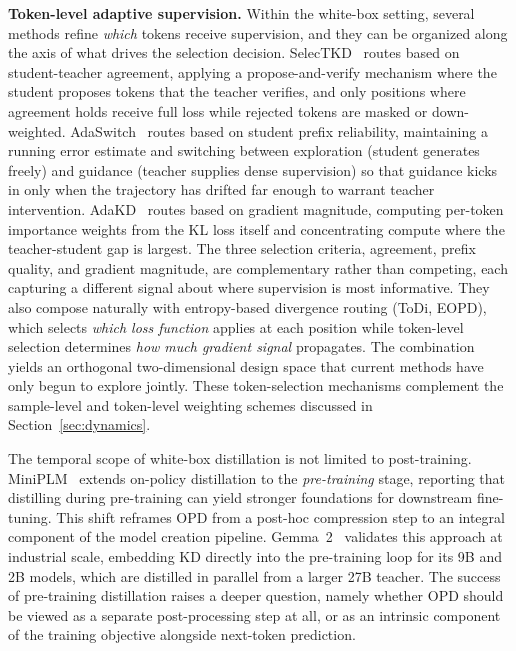 \documentclass{article} %
\begin{document}
\textbf{Token-level adaptive supervision.} Within the white-box setting, several methods refine \emph{which} tokens receive supervision, and they can be organized along the axis of what drives the selection decision. SelecTKD~\citep{2510.24021} routes based on student-teacher agreement, applying a propose-and-verify mechanism where the student proposes tokens that the teacher verifies, and only positions where agreement holds receive full loss while rejected tokens are masked or down-weighted. AdaSwitch~\citep{2510.07842} routes based on student prefix reliability, maintaining a running error estimate and switching between exploration (student generates freely) and guidance (teacher supplies dense supervision) so that guidance kicks in only when the trajectory has drifted far enough to warrant teacher intervention. AdaKD~\citep{2510.11615} routes based on gradient magnitude, computing per-token importance weights from the KL loss itself and concentrating compute where the teacher-student gap is largest. The three selection criteria, agreement, prefix quality, and gradient magnitude, are complementary rather than competing, each capturing a different signal about where supervision is most informative. They also compose naturally with entropy-based divergence routing (ToDi, EOPD), which selects \emph{which loss function} applies at each position while token-level selection determines \emph{how much gradient signal} propagates. The combination yields an orthogonal two-dimensional design space that current methods have only begun to explore jointly. These token-selection mechanisms complement the sample-level and token-level weighting schemes discussed in Section~\ref{sec:dynamics}.

The temporal scope of white-box distillation is not limited to post-training. MiniPLM~\citep{2410.17215} extends on-policy distillation to the \emph{pre-training} stage, reporting that distilling during pre-training can yield stronger foundations for downstream fine-tuning. This shift reframes OPD from a post-hoc compression step to an integral component of the model creation pipeline. Gemma~2~\citep{2408.00118} validates this approach at industrial scale, embedding KD directly into the pre-training loop for its 9B and 2B models, which are distilled in parallel from a larger 27B teacher. The success of pre-training distillation raises a deeper question, namely whether OPD should be viewed as a separate post-processing step at all, or as an intrinsic component of the training objective alongside next-token prediction.
\end{document}
